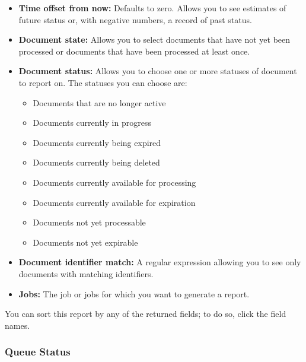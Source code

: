 \begin{changemargin}{1.5in}{0in}
\begin{itemize}
\item \textbf{Time offset from now:} Defaults to zero. Allows you to
see estimates of future status or, with negative numbers, a record of
past status.

\item \textbf{Document state:} Allows you to select documents that
have not yet been processed or documents that have been processed
at least once.

\item \textbf{Document status:} Allows you to choose one or more 
statuses of document to report on. The statuses you can choose are:

\begin{itemize}

\item Documents that are no longer active

\item Documents currently in progress

\item Documents currently being expired

\item Documents currently being deleted

\item Documents currently available for processing

\item Documents currently available for expiration

\item Documents not yet processable

\item Documents not yet expirable

\end{itemize}

\item \textbf{Document identifier match:} A regular expression allowing
you to see only documents with matching identifiers.

\item \textbf{Jobs:} The job or jobs for which you want to generate
a report.

\end{itemize}

You can sort this report by any of the returned fields; to do so,
click the field names.

\subsubsection{Queue Status}


\end{changemargin}
